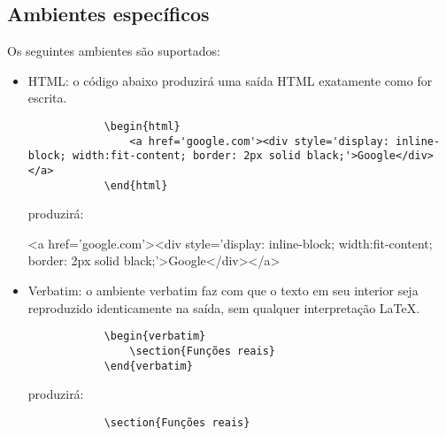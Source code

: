 

\newcommand{\com}[1]{\textbf{\backslash#1}}
\newcommand{\comp}[2]{\textbf{\backslash#1\{#2\}}}
\newcommand{\compp}[3]{\textbf{\backslash#1\{#2\}\{#3\}}}
\newcommand{\comop}[3]{\textbf{\backslash#1[#2]\{#3\}}}

\subsection{Ambientes específicos}

Os seguintes ambientes são suportados:

\begin{itemize}
    \item HTML: o código abaixo produzirá uma saída HTML exatamente como for escrita.
        \begin{verbatim}
            \begin{html}
                <a href='google.com'><div style='display: inline-block; width:fit-content; border: 2px solid black;'>Google</div></a>
            \end{html}\end{verbatim}
        produzirá:
        \begin{html}
            <a href='google.com'><div style='display: inline-block; width:fit-content; border: 2px solid black;'>Google</div></a>
        \end{html}
    
    \item Verbatim: o ambiente verbatim faz com que o texto em seu interior seja reproduzido identicamente na saída, sem qualquer interpretação LaTeX.
    
        \begin{verbatim}
            \begin{‎verbatim}
                \section{Funções reais}
            \end{‎verbatim}\end{verbatim}
        produzirá:
        
        \begin{verbatim}
            \section{Funções reais}\end{verbatim}
    

\end{itemize}
